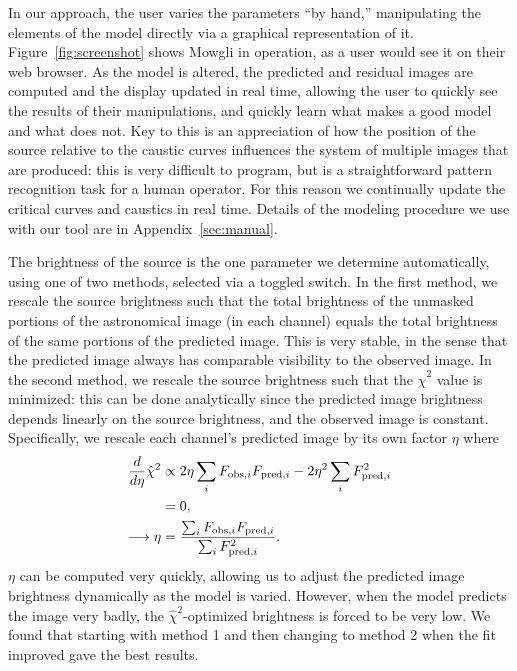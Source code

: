 \documentclass[iop]{emulateapj}
\def\rchisq{\hat{\chi}^2}
\def\theapplet{{\sc Mowgli}\xspace}
\begin{document}
In our approach, the user varies the parameters ``by hand,'' manipulating the
elements of the model directly via a graphical representation of it. 
Figure~\ref{fig:screenshot} shows \theapplet in operation, as a user would see
it on their web browser. As the model is altered, the predicted and residual
images are computed and the display updated in real time, allowing the user to
quickly see the results of their manipulations, and quickly learn what makes a
good model and what does not. Key to this is an appreciation of how the
position of the source relative to the caustic curves influences the system of
multiple images that are produced: this is very difficult to program, but is a
straightforward pattern recognition task for a human operator. For this reason
we continually update the critical curves and caustics in real time. Details
of the modeling procedure we use with our tool are in
Appendix~\ref{sec:manual}.

The brightness of the source is the one parameter we determine automatically,
using one of two methods, selected via a toggled switch.  In the first method,
we rescale the source brightness such that the total  brightness of the unmasked
portions of the astronomical image (in each channel) equals the total brightness
of the same portions of the predicted image. This is very stable, in the sense
that the predicted image always has comparable visibility to the observed image.
In the second method, we rescale the source brightness such that the $\rchisq$
value is minimized: this can be done analytically since the predicted image
brightness depends linearly on the source brightness,  and the observed image is
constant.  Specifically, we rescale each channel's  predicted image by its own
factor $\eta$ where
\begin{align}
\frac{d}{d \eta}\rchisq &\propto 2 \eta \sum_i F_{\text{obs},i} F_{\text{pred},i} - 2 \eta^2 \sum_i F_{\text{pred},i}^2 \\
                        &= 0, \notag \\
\longrightarrow    \eta &= \frac{\sum_i F_{\text{obs},i} F_{\text{pred},i}}
                                {\sum_i F_{\text{pred},i}^2}.
\end{align}
$\eta$ can be computed very quickly, allowing us to  adjust the predicted image
brightness dynamically as the model is varied. However, when the model predicts
the image very badly, the $\rchisq$-optimized brightness is forced to be  very
low. We found that starting with method 1 and then changing to method 2 when the
fit improved gave the best results.
\end{document}
